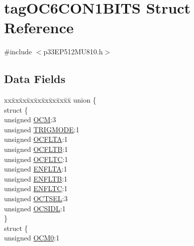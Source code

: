 \hypertarget{structtag_o_c6_c_o_n1_b_i_t_s}{}\section{tag\+O\+C6\+C\+O\+N1\+B\+I\+TS Struct Reference}
\label{structtag_o_c6_c_o_n1_b_i_t_s}


{\ttfamily \#include $<$p33\+E\+P512\+M\+U810.\+h$>$}

\subsection*{Data Fields}
\begin{DoxyCompactItemize}
\item 
\begin{tabbing}
xx\=xx\=xx\=xx\=xx\=xx\=xx\=xx\=xx\=\kill
union \{\\
\>struct \{\\
\>\>unsigned \hyperlink{structtag_o_c6_c_o_n1_b_i_t_s_a778fa0cf51a9477ac4e82d71a8733801}{OCM}:3\\
\>\>unsigned \hyperlink{structtag_o_c6_c_o_n1_b_i_t_s_a7a0057e0dca6e2663584b5b9e1da04c3}{TRIGMODE}:1\\
\>\>unsigned \hyperlink{structtag_o_c6_c_o_n1_b_i_t_s_acc967e41cecdeedc6ad4422f9ef1a6a3}{OCFLTA}:1\\
\>\>unsigned \hyperlink{structtag_o_c6_c_o_n1_b_i_t_s_a1fb30bb4421ef7c4bd0c66c379875593}{OCFLTB}:1\\
\>\>unsigned \hyperlink{structtag_o_c6_c_o_n1_b_i_t_s_a69a1772a4144abd579d17d28445b9934}{OCFLTC}:1\\
\>\>unsigned \hyperlink{structtag_o_c6_c_o_n1_b_i_t_s_a1e0f05fb23d516e003e4713fe8c1498a}{ENFLTA}:1\\
\>\>unsigned \hyperlink{structtag_o_c6_c_o_n1_b_i_t_s_a9d7aa97d5328b8b81ab7fd9145dfa0fc}{ENFLTB}:1\\
\>\>unsigned \hyperlink{structtag_o_c6_c_o_n1_b_i_t_s_a0b6f25c0f83f33b5501b6a2e6141a6ef}{ENFLTC}:1\\
\>\>unsigned \hyperlink{structtag_o_c6_c_o_n1_b_i_t_s_ae37d2a41dae2d2af1d82f7caae33cadb}{OCTSEL}:3\\
\>\>unsigned \hyperlink{structtag_o_c6_c_o_n1_b_i_t_s_afd05f4f249db4ef69b684e2f3fa6b703}{OCSIDL}:1\\
\>\} \\
\>struct \{\\
\>\>unsigned \hyperlink{structtag_o_c6_c_o_n1_b_i_t_s_a9271e84c9759ff10a7bc1cee3276e8f6}{OCM0}:1\\

\end{tabbing}
\end{DoxyCompactItemize}
